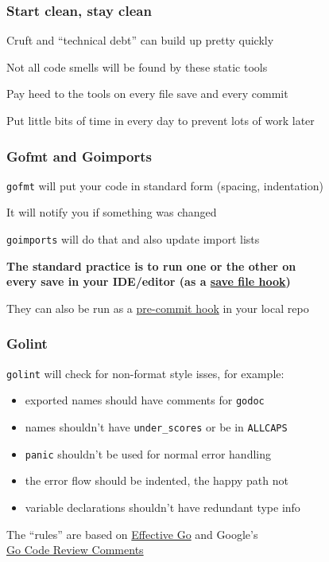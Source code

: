 \documentclass[handout,compress,t,11pt]{beamer}
\begin{document}
\begin{frame}[fragile]
    \frametitle{Start clean, stay clean}
    Cruft and ``technical debt'' can build up pretty quickly \par
    \vspace{0.4\baselineskip}
    Not all code smells will be found by these static tools \par
    \vspace{3\baselineskip}
    Pay heed to the tools on every file save and every commit \par
    \vspace{0.4\baselineskip}
    Put little bits of time in every day to prevent lots of work later
\end{frame}

\begin{frame}[fragile]
    \frametitle{Gofmt and Goimports}
    \verb|gofmt| will put your code in standard form (spacing, indentation) \par
    \vspace{0.4\baselineskip}
    It will notify you if something was changed \par
    \vspace{0.4\baselineskip}
    \verb|goimports| will do that and also update import lists \par
    \vspace{4\baselineskip}
    {\bf The standard practice is to run one or the other on\\
    every save in your IDE/editor (as a 
    \href{https://blog.golang.org/go-fmt-your-code}{save file hook})} \par
    \vspace{\baselineskip}
    They can also be run as a 
    \href{https://github.com/golang/go/blob/master/misc/git/pre-commit}%
    {pre-commit hook} in your local repo
\end{frame}

\begin{frame}[fragile]
    \frametitle{Golint}
    \verb|golint| will check for non-format style isses, for example: 
    \begin{itemize}
        \item exported names should have comments for \verb|godoc|
        \item names shouldn't have \verb|under_scores| or be in \verb|ALLCAPS|
        \item \verb|panic| shouldn't be used for normal error handling
        \item the error flow should be indented, the happy path not
        \item variable declarations shouldn't have redundant type info
    \end{itemize}
    \vspace{3\baselineskip}
    The ``rules'' are based on \href{https://golang.org/doc/effective_go.html}{Effective Go} and
     Google's\\ \href{https://github.com/golang/go/wiki/CodeReviewComments}{Go Code Review Comments}
\end{frame}
\end{document}
